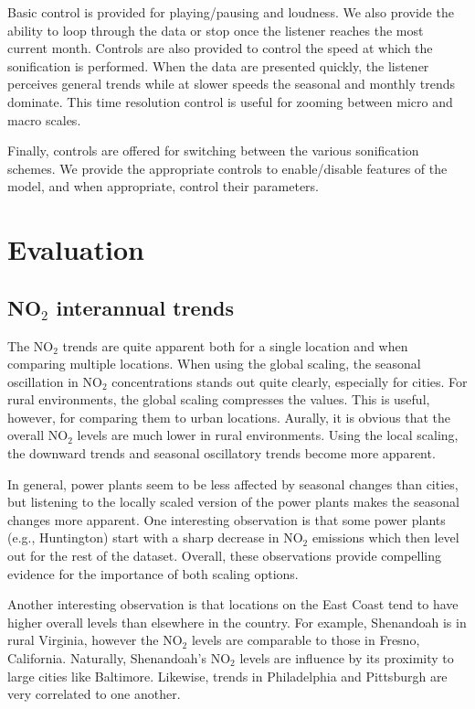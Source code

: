 \documentclass[a4paper,10pt,oneside]{article}
\newcommand{\ce}[1]{$\mathrm{#1}$}
\begin{document}
\begin{sloppy}
Basic control is provided for playing/pausing and loudness. We also provide the ability to loop through the data or stop once the listener reaches the most current month.  Controls are also provided to control the speed at which the sonification is performed.  When the data are presented quickly, the listener perceives general trends while at slower speeds the seasonal and monthly trends dominate.  This time resolution control is useful for zooming between micro and macro scales.  

Finally, controls are offered for switching between the various sonification schemes. We provide the appropriate controls to enable/disable features of the model, and when appropriate, control their parameters.  

\section{Evaluation}

\subsection{NO$_2$ interannual trends}
The \ce{NO_2} trends are quite apparent both for a single location and when comparing multiple locations.  When using the global scaling, the seasonal oscillation in \ce{NO_2} concentrations stands out quite clearly, especially for cities. For rural environments, the global scaling compresses the values.  This is useful, however, for comparing them to urban locations.  Aurally, it is obvious that the overall \ce{NO_2} levels are much lower in rural environments. Using the local scaling, the downward trends and seasonal oscillatory trends become more apparent. 

In general, power plants seem to be less affected by seasonal changes than cities, but listening to the locally scaled version of the power plants makes the seasonal changes more apparent. One interesting observation is that some power plants (e.g., Huntington) start with a sharp decrease in \ce{NO_2} emissions which then level out for the rest of the dataset. Overall, these observations provide compelling evidence for the importance of both scaling options.  

Another interesting observation is that locations on the East Coast tend to have higher overall levels than elsewhere in the country.  For example, Shenandoah is in rural Virginia, however the \ce{NO_2} levels are comparable to those in Fresno, California.  Naturally, Shenandoah's  \ce{NO_2} levels are influence by its proximity to large cities like Baltimore. Likewise, trends in Philadelphia and Pittsburgh are very correlated to one another. 


\end{sloppy}
\end{document}
